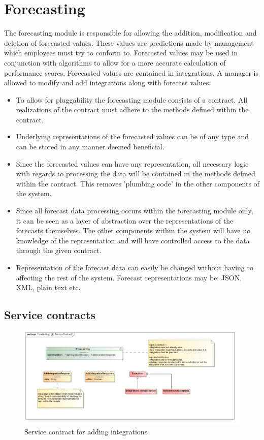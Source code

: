 \documentclass[11pt,a4paper]{article}
\begin{document}
\section{Forecasting}

The forecasting module is responsible for allowing the addition, modification and deletion of forecasted values. These values are predictions made by management which employees must try to conform to. Forecasted values may be used in conjunction with algorithms to allow for a more accurate calculation of performance scores. Forecasted values are contained in integrations. A manager is allowed to modify and add integrations along with forecast values.

\begin{itemize}
	\item To allow for pluggability the forecasting module consists of a contract. All realizations of the contract must adhere to the methods defined within the contract.
	
	\item Underlying representations of the forecasted values can be of any type and can be stored in any manner deemed beneficial.
	
	\item Since the forecasted values can have any representation, all necessary logic with regards to processing the data will be contained in the methods defined within the contract. This removes 'plumbing code' in the other components of the system.
	
	\item Since all forecast data processing occurs within the forecasting module only, it can be seen as a layer of abstraction over the representations of the forecasts themselves. The other components within the system will have no knowledge of the representation and will have controlled access to the data through the given contract.
	
	\item Representation of the forecast data can easily be changed without having to affecting the rest of the system. Forecast representations may be: JSON, XML, plain text etc. 
\end{itemize} 

\subsection{Service contracts}

\begin{figure}[h!]
	\includegraphics[width=\linewidth]{../Images/addIntegration_Service_Contract}
	\caption{Service contract for adding integrations}
\end{figure}
\end{document}
